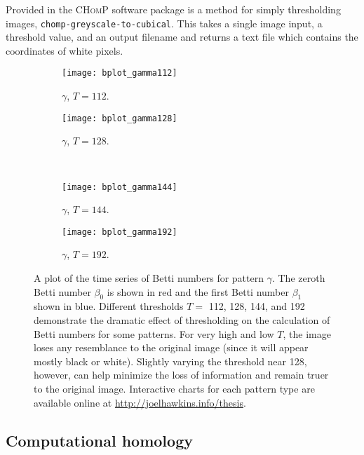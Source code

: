 Provided in the \textsc{CHomP} software package is a method for simply thresholding images, \texttt{chomp-greyscale-to-cubical}. This takes a single image input, a threshold value, and an output filename and returns a text file which contains the coordinates of white pixels.

\begin{sidewaysfigure}[p]
	\centering
	\begin{subfigure}[b]{0.45\textwidth}
                \texttt{[image: bplot\_gamma112]}
                \caption{$\gamma$, $T = 112$.}
                \label{fig:bplot_gamma112}
        \end{subfigure} \quad
	\begin{subfigure}[b]{0.45\textwidth}
                \texttt{[image: bplot\_gamma128]}
                \caption{$\gamma$, $T = 128$.}
                \label{fig:bplot_gamma128}
        \end{subfigure} \hfill \\
	\begin{subfigure}[b]{0.45\textwidth}
                \texttt{[image: bplot\_gamma144]}
                \caption{$\gamma$, $T = 144$.}
                \label{fig:bplot_gamma144}
       \end{subfigure} \quad
       \begin{subfigure}[b]{0.45\textwidth}
                \texttt{[image: bplot\_gamma192]}
                \caption{$\gamma$, $T = 192$.}
                \label{fig:bplot_gamma192}
        \end{subfigure}
        
        \caption{A plot of the time series of Betti numbers for pattern $\gamma$. The zeroth Betti number $\beta_0$ is shown in red and the first Betti number $\beta_1$ shown in blue. Different thresholds $T =$ 112, 128, 144, and 192 demonstrate the dramatic effect of thresholding on the calculation of Betti numbers for some patterns. For very high and low $T$, the image loses any resemblance to the original image (since it will appear mostly black or white). Slightly varying the threshold near 128, however, can help minimize the loss of information and remain truer to the original image. Interactive charts for each pattern type are available online at \url{http://joelhawkins.info/thesis}.} \label{fig:bplots_gamma}
\end{sidewaysfigure}

\newpage
\subsection{Computational homology} \label{sect:chomping}

